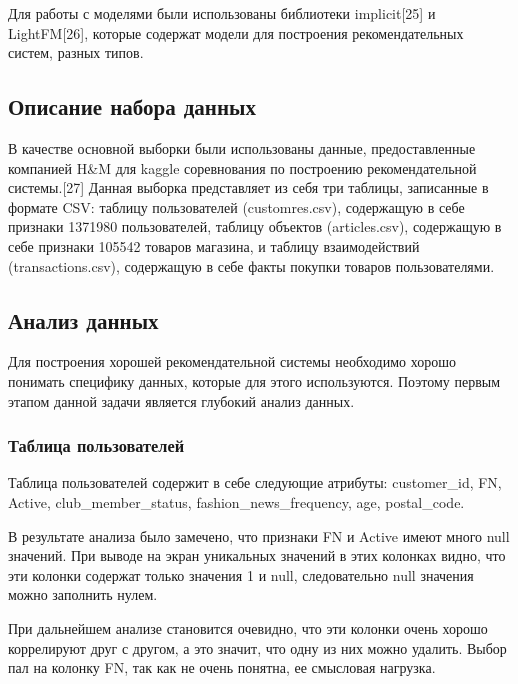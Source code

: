\documentclass[bachelor, och, coursework]{SCWorks}
\begin{document}
Для работы с моделями были использованы библиотеки implicit[25] и LightFM[26], которые содержат модели для построения рекомендательных систем, разных типов.

\subsection{Описание набора данных}
В качестве основной выборки были использованы данные, предоставленные компанией H\&M для kaggle соревнования по построению рекомендательной системы.[27] Данная выборка
представляет из себя три таблицы, записанные в формате CSV: таблицу пользователей (customres.csv), содержащую в себе признаки 1371980 пользователей, таблицу объектов (articles.csv),
содержащую в себе признаки 105542 товаров магазина, и таблицу взаимодействий (transactions.csv), содержащую в себе факты покупки товаров пользователями.

\subsection{Анализ данных}
Для построения хорошей рекомендательной системы необходимо хорошо понимать специфику данных, которые для этого используются. Поэтому первым этапом данной задачи является глубокий анализ данных.
\subsubsection{Таблица пользователей}
Таблица пользователей содержит в себе следующие атрибуты: customer_id, FN, Active, club_member_status, fashion_news_frequency, age, postal_code.

В результате анализа было замечено, что признаки FN и Active имеют много null значений. При выводе на экран уникальных значений в этих колонках видно, что эти колонки содержат только значения 1 и null, следовательно null значения можно заполнить нулем.

При дальнейшем анализе становится очевидно, что эти колонки очень хорошо коррелируют друг с другом, а это значит, что одну из них можно удалить. Выбор пал на колонку FN, так как не очень понятна, ее смысловая нагрузка.
\end{document}
